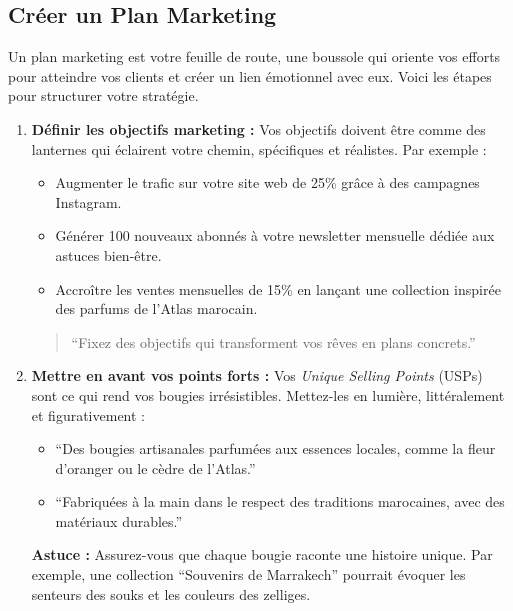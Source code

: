 \documentclass[11pt,fleqn,onecolumn,oneside]{book}
\begin{document}
\subsection*{Créer un Plan Marketing}

Un plan marketing est votre feuille de route, une boussole qui oriente vos efforts pour atteindre vos clients et créer un lien émotionnel avec eux. Voici les étapes pour structurer votre stratégie.

\begin{enumerate}
    \item \textbf{Définir les objectifs marketing :} Vos objectifs doivent être comme des lanternes qui éclairent votre chemin, spécifiques et réalistes. Par exemple :
    \begin{itemize}
        \item Augmenter le trafic sur votre site web de 25\% grâce à des campagnes Instagram.
        \item Générer 100 nouveaux abonnés à votre newsletter mensuelle dédiée aux astuces bien-être.
        \item Accroître les ventes mensuelles de 15\% en lançant une collection inspirée des parfums de l’Atlas marocain.
    \end{itemize}
    
    \begin{quote}
    ``Fixez des objectifs qui transforment vos rêves en plans concrets.'' 
    \end{quote}
    
    \item \textbf{Mettre en avant vos points forts :} Vos \textit{Unique Selling Points} (USPs) sont ce qui rend vos bougies irrésistibles. Mettez-les en lumière, littéralement et figurativement :
    \begin{itemize}
        \item ``Des bougies artisanales parfumées aux essences locales, comme la fleur d’oranger ou le cèdre de l’Atlas.''
        \item ``Fabriquées à la main dans le respect des traditions marocaines, avec des matériaux durables.''
    \end{itemize}
    
    \begin{remark}
    \textbf{Astuce :} Assurez-vous que chaque bougie raconte une histoire unique. Par exemple, une collection ``Souvenirs de Marrakech'' pourrait évoquer les senteurs des souks et les couleurs des zelliges.
    \end{remark}
    

\end{enumerate}
\end{document}
